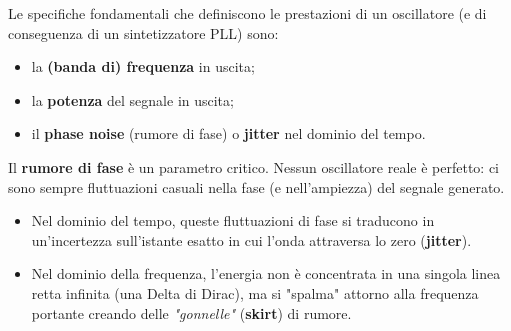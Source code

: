 \documentclass[openany,a4paper,12pt]{book}
\begin{document}
Le specifiche fondamentali che definiscono le prestazioni di un oscillatore (e di conseguenza di un sintetizzatore PLL) sono:
\begin{itemize}[label=\textcolor{PoliBlue}{\textbullet}]
    \item la \textbf{(banda di) frequenza} in uscita;
    \item la \textbf{potenza} del segnale in uscita;
    \item il \textbf{phase noise} (rumore di fase) o \textbf{jitter} nel dominio del tempo.
\end{itemize}

Il \textbf{rumore di fase} è un parametro critico. Nessun oscillatore reale è perfetto: ci sono sempre fluttuazioni casuali nella fase (e nell'ampiezza) del segnale generato. 
\begin{itemize}[label=\textcolor{OpticRed}{\textbullet}]
    \item Nel dominio del tempo, queste fluttuazioni di fase si traducono in un'incertezza sull'istante esatto in cui l'onda attraversa lo zero (\textbf{jitter}).
    \item Nel dominio della frequenza, l'energia non è concentrata in una singola linea retta infinita (una Delta di Dirac), ma si "spalma" attorno alla frequenza portante creando delle \textit{"gonnelle"} (\textbf{skirt}) di rumore.
\end{itemize}
\end{document}
